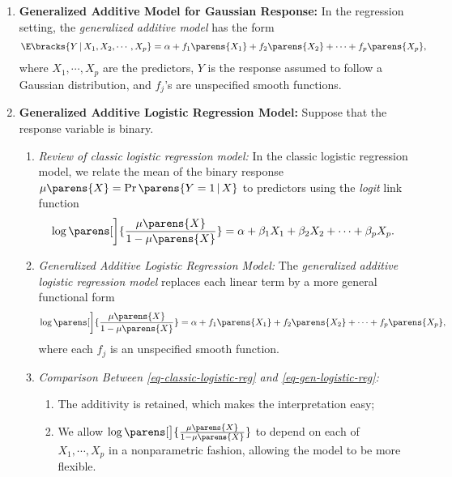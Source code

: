 \documentclass[12pt]{article}
\begin{document}
\begin{enumerate}[label=\textbf{\arabic*.}]
	
	\item \textbf{Generalized Additive Model for Gaussian Response:} In the regression setting, the \emph{generalized additive model} has the form 
	\begin{align}\label{eq-gaussian-gam}
		\E \bracks{Y \,\vert\, X_1, X_2, \cdots, X_p} = \alpha + f_1 \parens{X_1} + f_2 \parens{X_2} + \cdots + f_p \parens{X_p}, 
	\end{align}
	where $X_1, \cdots, X_p$ are the predictors, $Y$ is the response assumed to follow a Gaussian distribution, and $f_j$'s are unspecified smooth functions. 
	
	\item \textbf{Generalized Additive Logistic Regression Model:} Suppose that the response variable is binary. 
	\begin{enumerate}
		\item \textit{Review of classic logistic regression model:} In the classic logistic regression model, we relate the mean of the binary response $\mu \parens{X} = \Pr \parens{Y = 1 \,\vert\, X}$ to predictors using the \emph{logit} link function 
		\begin{align}\label{eq-classic-logistic-reg}
			\log \parens[\bigg]{\frac{\mu \parens{X}}{1 - \mu \parens{X}}} = \alpha + \beta_1 X_1 + \beta_2 X_2 + \cdots + \beta_p X_p. 
		\end{align}
		
		\item \textit{Generalized Additive Logistic Regression Model:} The \emph{generalized additive logistic regression model} replaces each linear term by a more general functional form 
		\begin{align}\label{eq-gen-logistic-reg}
			\log \parens[\bigg]{\frac{\mu \parens{X}}{1 - \mu \parens{X}}} = \alpha + f_1 \parens{X_1} + f_2 \parens{X_2} + \cdots + f_p \parens{X_p}, 
		\end{align}
		where each $f_j$ is an unspecified smooth function. 
		
		\item \textit{Comparison Between \eqref{eq-classic-logistic-reg} and \eqref{eq-gen-logistic-reg}:} 
		\begin{enumerate}
			\item The additivity is retained, which makes the interpretation easy; 
			\item We allow $\log \parens[\big]{\frac{\mu \parens{X}}{1 - \mu \parens{X}}}$ to depend on each of $X_1, \cdots, X_p$ in a nonparametric fashion, allowing the model to be more flexible. 
		\end{enumerate}
	\end{enumerate}
	

\end{enumerate}
\end{document}

